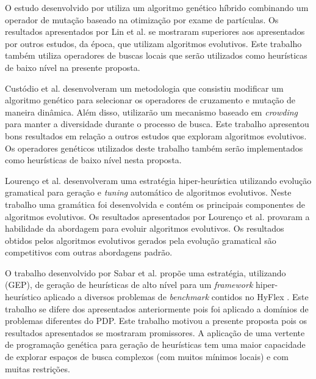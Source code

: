 O estudo desenvolvido por \cite{lin2011protein} utiliza um algoritmo genético híbrido combinando um operador de mutação baseado na otimização por exame de partículas. Os resultados apresentados por Lin et al. se mostraram superiores aos apresentados por outros estudos, da época, que utilizam algoritmos evolutivos. Este trabalho também utiliza operadores de buscas locais que serão utilizados como heurísticas de baixo nível na presente proposta. 


Custódio et al. \cite{custodio2014multiple} desenvolveram um metodologia que consistiu modificar um algoritmo genético para selecionar os operadores de cruzamento e mutação de maneira dinâmica. Além disso, utilizarão um mecanismo baseado em \textit{crowding}  para manter a diversidade durante o processo de busca. Este trabalho apresentou bons resultados em relação a outros estudos que exploram algoritmos evolutivos. Os operadores genéticos utilizados deste trabalho também serão implementados como heurísticas de baixo nível nesta proposta. 


Lourenço et al. \cite{lourencco2012evolving} desenvolveram uma estratégia hiper-heurística utilizando evolução gramatical para geração e \textit{tuning} automático de algoritmos evolutivos. Neste trabalho uma gramática foi desenvolvida e contém os principais componentes de algoritmos evolutivos. Os resultados apresentados por Lourenço et al. provaram a habilidade da abordagem para evoluir algoritmos evolutivos. Os resultados obtidos pelos algoritmos evolutivos gerados pela evolução gramatical são competitivos com outras abordagens padrão.


O trabalho desenvolvido por Sabar et al. \cite{sabar2014automatic} propõe uma estratégia, utilizando  (GEP), de geração de heurísticas de alto nível para um \textit {framework} hiper-heurístico aplicado a diversos problemas de \textit{benchmark} contidos no  HyFlex \cite{ochoa2012hyflex}. Este trabalho se difere dos apresentados anteriormente pois foi aplicado a domínios de problemas diferentes do PDP. Este trabalho motivou a presente proposta pois os resultados apresentados se mostraram promissores. A aplicação de uma vertente de programação genética para geração de heurísticas tem uma maior capacidade de explorar espaços de busca complexos (com muitos mínimos locais) e com muitas restrições.



